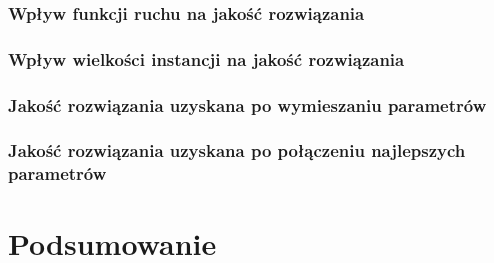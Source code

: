 \subsection{Wpływ funkcji ruchu na jakość rozwiązania}
\subsection{Wpływ wielkości instancji na jakość rozwiązania}
\subsection{Jakość rozwiązania uzyskana po wymieszaniu parametrów}
\subsection{Jakość rozwiązania uzyskana po połączeniu najlepszych parametrów}

\chapter{Podsumowanie}
